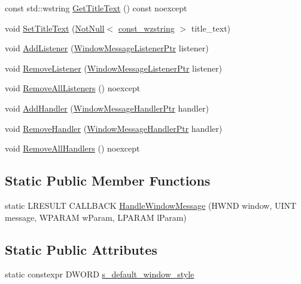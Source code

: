 \begin{DoxyCompactItemize}
\item 
const std\+::wstring \mbox{\hyperlink{classmage_1_1_window_a151cab52659daf96bdcf5bf89985d7b8}{Get\+Title\+Text}} () const noexcept
\item 
void \mbox{\hyperlink{classmage_1_1_window_a7f5e2e528eb26bf6750131a1d72db28e}{Set\+Title\+Text}} (\mbox{\hyperlink{namespacemage_a8769f9d670d6b585ea306cb1062af94b}{Not\+Null}}$<$ \mbox{\hyperlink{namespacemage_ac409e0f2a22292a3a4cd42742994fbf0}{const\+\_\+wzstring}} $>$ title\+\_\+text)
\item 
void \mbox{\hyperlink{classmage_1_1_window_ac6020962e1fd29118675207bde5d216d}{Add\+Listener}} (\mbox{\hyperlink{classmage_1_1_window_a0e0a4f2a3f6db176f6aec454b94a06fb}{Window\+Message\+Listener\+Ptr}} listener)
\item 
void \mbox{\hyperlink{classmage_1_1_window_a0f30903e406cf3cde3682befafcd3eba}{Remove\+Listener}} (\mbox{\hyperlink{classmage_1_1_window_a0e0a4f2a3f6db176f6aec454b94a06fb}{Window\+Message\+Listener\+Ptr}} listener)
\item 
void \mbox{\hyperlink{classmage_1_1_window_a1bb37381e94c541027d1ee4da7f6c7e2}{Remove\+All\+Listeners}} () noexcept
\item 
void \mbox{\hyperlink{classmage_1_1_window_ae33b5ea74354830278c9ee130fa917c7}{Add\+Handler}} (\mbox{\hyperlink{classmage_1_1_window_add1d792fb9f71e70d4fb07409d80cfdd}{Window\+Message\+Handler\+Ptr}} handler)
\item 
void \mbox{\hyperlink{classmage_1_1_window_a81b23a696f73636ec9aa985ceda391b4}{Remove\+Handler}} (\mbox{\hyperlink{classmage_1_1_window_add1d792fb9f71e70d4fb07409d80cfdd}{Window\+Message\+Handler\+Ptr}} handler)
\item 
void \mbox{\hyperlink{classmage_1_1_window_a9b1efac3d0bd27df4e33ab704bc59f98}{Remove\+All\+Handlers}} () noexcept
\end{DoxyCompactItemize}
\subsection*{Static Public Member Functions}
\begin{DoxyCompactItemize}
\item 
static L\+R\+E\+S\+U\+LT C\+A\+L\+L\+B\+A\+CK \mbox{\hyperlink{classmage_1_1_window_a1bd8a958bb5e15f22982a74a513a715e}{Handle\+Window\+Message}} (H\+W\+ND window, U\+I\+NT message, W\+P\+A\+R\+AM w\+Param, L\+P\+A\+R\+AM l\+Param)
\end{DoxyCompactItemize}
\subsection*{Static Public Attributes}
\begin{DoxyCompactItemize}
\item 
static constexpr D\+W\+O\+RD \mbox{\hyperlink{classmage_1_1_window_ac680bdd3d5359f66b2dea082ef45e0da}{s\+\_\+default\+\_\+window\+\_\+style}}
\end{DoxyCompactItemize}
